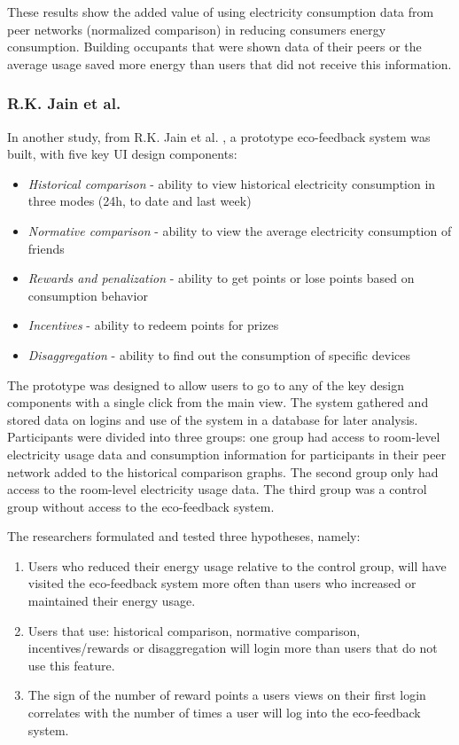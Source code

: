 \documentclass[journal]{vgtc}                %
\begin{document}
These results show the added value of using electricity consumption data from peer networks (normalized comparison) in reducing consumers energy consumption. Building occupants that were shown data of their peers or the average usage saved more energy than users that did not receive this information.

\subsubsection{R.K. Jain et al.}
In another study, from R.K. Jain et al. \cite{jain2012assessing}, a prototype eco-feedback system was built, with five key UI design components:
\begin{itemize}
\item \textit{Historical comparison} - ability to view historical electricity consumption in three modes (24h, to date and last week)
\item \textit{Normative comparison} - ability to view the average electricity consumption of friends
\item \textit{Rewards and penalization} - ability to get points or lose points based on consumption behavior
\item \textit{Incentives} - ability to redeem points for prizes
\item \textit{Disaggregation} - ability to find out the consumption of specific devices
\end{itemize}

The prototype was designed to allow users to go to any of the key design components with a single click from the main view. The system gathered and stored data on logins and use of the system in a database for later analysis.\\

Participants were divided into three groups: one group had access to room-level electricity usage data and consumption information for participants in their peer network added to the historical comparison graphs. 
The second group only had access to the room-level electricity usage data.
The third group was a control group without access to the eco-feedback system.

The researchers formulated and tested three hypotheses, namely:
\begin{enumerate}
\item Users who reduced their energy usage relative to the control group, will have visited the eco-feedback system more often than users who increased or maintained their energy usage.
\item Users that use: historical comparison, normative comparison, incentives/rewards or disaggregation will login more than users that do not use this feature.
\item The sign of the number of reward points a users views on their first login correlates with the number of times a user will log into the eco-feedback system.
\end{enumerate}
\end{document}
